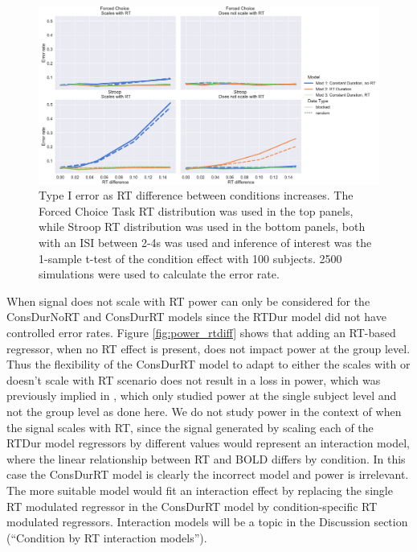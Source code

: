 \documentclass[titlepage,12pt] {article}
\begin{document}
\begin{figure}
  \centering
   \includegraphics[width=5in]{Figures/type1_err_24.pdf}
   \caption{Type I error as RT difference between conditions increases.  The Forced Choice Task RT distribution was used in the top panels, while Stroop RT distribution was used in the bottom panels, both with an ISI between 2-4s was used and inference of interest was the 1-sample t-test of the condition effect with 100 subjects.  2500 simulations were used to calculate the error rate.}
  \label{fig:type1err_24}
\end{figure}

When signal does not scale with RT power can only be considered for the ConsDurNoRT and ConsDurRT models since the RTDur model did not have controlled error rates. Figure \ref{fig:power_rtdiff}  shows that adding an RT-based regressor, when no RT effect is present, does not impact power at the group level.  Thus the flexibility of the ConsDurRT model to adapt to either the scales with or doesn't scale with RT scenario does not result in a loss in power, which was previously implied in \citet{grinband_detection_2008}, which only studied power at the single subject level and not the group level as done here.  We do not study power in the context of when the signal scales with RT, since the signal generated by scaling each of the RTDur model regressors by different values would represent an interaction model, where the linear relationship between RT and BOLD differs by condition.  In this case the ConsDurRT model is clearly the incorrect model and power is irrelevant.  The more suitable model would fit an interaction effect by replacing the single RT modulated regressor in the ConsDurRT model by condition-specific RT modulated regressors.  Interaction models will be a topic in the Discussion section (``Condition by RT interaction models'').
\end{document}
